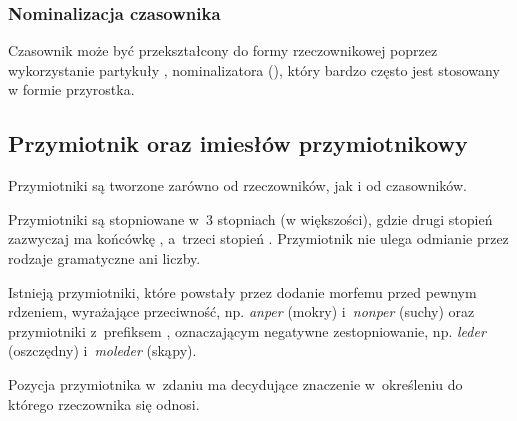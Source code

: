 \begin{spacing}{1.1}


\subsubsection{Nominalizacja czasownika}

Czasownik może być przekształcony do formy rzeczownikowej poprzez wykorzystanie
partykuły , nominalizatora (\Nmlz{}), który bardzo często jest stosowany w
formie przyrostka.




\subsection{Przymiotnik oraz imiesłów przymiotnikowy}

Przymiotniki są tworzone zarówno od rzeczowników, jak i od czasowników.

Przymiotniki są stopniowane w~3 stopniach (w większości), gdzie drugi stopień
zazwyczaj ma końcówkę , a~trzeci stopień . Przymiotnik nie
ulega odmianie przez rodzaje gramatyczne ani liczby.

Istnieją przymiotniki, które powstały przez dodanie morfemu  przed
pewnym rdzeniem, wyrażające przeciwność, np. \emph{anper}  (mokry)
i~\emph{nonper}  (suchy) oraz przymiotniki z~prefiksem ,
oznaczającym negatywne zestopniowanie, np. \emph{leder}  (oszczędny)
i~\emph{moleder}  (skąpy).

Pozycja przymiotnika w~zdaniu ma decydujące znaczenie w~określeniu do którego
rzeczownika się odnosi.




\end{spacing}
